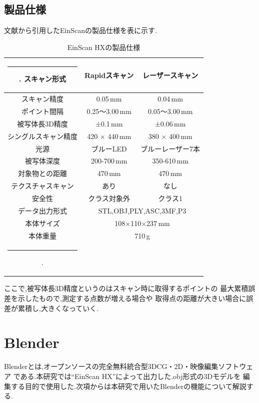 \documentclass{ltjsreport}
\makeatletter
\def\Hline{
  \noalign{\ifnum0=`}\fi\hrule \@height 3.\arrayrulewidth \futurelet
  \reserved@a\@xhline}
\makeatother
\begin{document}
		\subsection{製品仕様}
			文献\cite{ref:4}から引用したEinScanの製品仕様を表に示す.
			\begin{table}[H]
			\begin{center}
			\caption{EinScan HXの製品仕様}
			\label{tab:EinScan}
			\begin{tabular}{c|cc} \Hline
				スキャン形式&Rapidスキャン&レーザースキャン\\ \hline
				スキャン精度&0.05\,mm&0.04\,mm\\
				ポイント間隔&0.25～3.00\,mm&0.05～3.00\,mm\\
				被写体長3D精度&±0.1\,mm&±0.06\,mm\\
				シングルスキャン精度&420 × 440\,mm&380 × 400\,mm\\
				光源&ブルーLED&ブルーレーザー7本\\
				被写体深度&200-700\,mm&350-610\,mm\\
				対象物との距離&470\,mm&470\,mm\\
				テクスチャスキャン&あり&なし\\
				安全性&クラス対象外&クラス1\\ \hline
				データ出力形式&\multicolumn{2}{c}{STL,OBJ,PLY,ASC,3MF,P3}\\
				本体サイズ&\multicolumn{2}{c}{108×110×237\,mm}\\
				本体重量&\multicolumn{2}{c}{710\,g}\\ \Hline
			\end{tabular}
			\end{center}
			\hspace{-32truemm}
			\end{table}
			ここで,被写体長3D精度というのはスキャン時に取得するポイントの
			最大累積誤差を示したもので,測定する点数が増える場合や
			取得点の距離が大きい場合に誤差が累積し,大きくなっていく.

	\section{Blender}
		Blenderとは,オープンソースの完全無料統合型3DCG・2D・映像編集ソフトウェア
		である.本研究では``EinScan HX''によって出力した.obj形式の3Dモデルを
		編集する目的で使用した.次項からは本研究で用いたBlenderの機能について解説する.
\end{document}
